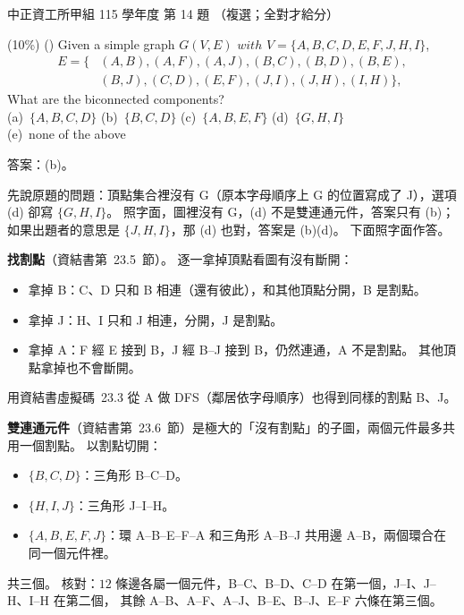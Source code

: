 \begin{pastexam}[label={px:ccu-115-swa-04}]{中正資工所甲組 115 學年度 第 14 題}
（複選；全對才給分）

(10\%) (\qquad) Given a simple graph $G(V,E)$ $with$ $V=\{A,B,C,D,E,F,J,H,I\}$,
\[\begin{aligned}E=\{&(A,B),(A,F),(A,J),(B,C),(B,D),(B,E),\\&(B,J),(C,D),(E,F),(J,I),(J,H),(I,H)\},\end{aligned}\]
What are the biconnected components?\\
(a)~$\{A,B,C,D\}$ \qquad (b)~$\{B,C,D\}$ \qquad (c)~$\{A,B,E,F\}$ \qquad (d)~$\{G,H,I\}$\\
(e)~none of the above
\end{pastexam}

\begin{pastsoln}
答案：(b)。

先說原題的問題：頂點集合裡沒有 G（原本字母順序上 G 的位置寫成了 J），選項 (d) 卻寫
$\{G, H, I\}$。 照字面，圖裡沒有 G，(d) 不是雙連通元件，答案只有 (b)；如果出題者的意思是
$\{J, H, I\}$，那 (d) 也對，答案是 (b)(d)。 下面照字面作答。

\begin{center}
\end{center}

\textbf{找割點}（資結書第~23.5~節）。 逐一拿掉頂點看圖有沒有斷開：
\begin{itemize}
\item 拿掉 B：C、D 只和 B 相連（還有彼此），和其他頂點分開，B 是割點。
\item 拿掉 J：H、I 只和 J 相連，分開，J 是割點。
\item 拿掉 A：F 經 E 接到 B，J 經 B--J 接到 B，仍然連通，A 不是割點。 其他頂點拿掉也不會斷開。
\end{itemize}
用資結書虛擬碼~23.3 從 A 做 DFS（鄰居依字母順序）也得到同樣的割點 B、J。

\textbf{雙連通元件}（資結書第~23.6~節）是極大的「沒有割點」的子圖，兩個元件最多共用一個割點。
以割點切開：
\begin{itemize}
\item $\{B, C, D\}$：三角形 B--C--D。
\item $\{H, I, J\}$：三角形 J--I--H。
\item $\{A, B, E, F, J\}$：環 A--B--E--F--A 和三角形 A--B--J 共用邊 A--B，兩個環合在同一個元件裡。
\end{itemize}
共三個。 核對：$12$ 條邊各屬一個元件，B--C、B--D、C--D 在第一個，J--I、J--H、I--H 在第二個，
其餘 A--B、A--F、A--J、B--E、B--J、E--F 六條在第三個。


\end{pastsoln}
